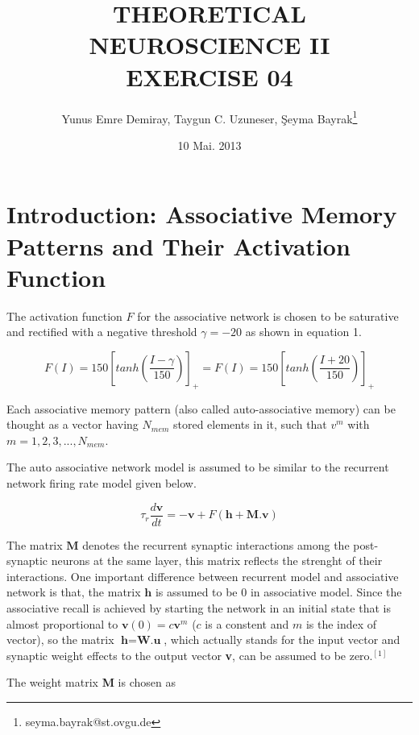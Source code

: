 \documentclass{article}
\begin{document}
\title{THEORETICAL NEUROSCIENCE II \\ EXERCISE 04}
\date{10 Mai. 2013}
\author[1]{Yunus Emre Demiray, Taygun C. Uzuneser, \c{S}eyma Bayrak\thanks{seyma.bayrak@st.ovgu.de}}
\maketitle

\newpage

\section{Introduction: Associative Memory Patterns and Their Activation Function}
The activation function $F$ for the associative network is chosen to be saturative and rectified with a negative threshold $\gamma=-20$ as shown in equation 1.

\begin{equation}
 F(I)=150[tanh(\frac{I-\gamma}{150})]_+=F(I)=150[tanh(\frac{I+20}{150})]_+
\end{equation}

Each associative memory pattern (also called auto-associative memory) can be thought as a vector having $N_{mem}$ stored elements in it, such that $v^m$ with $m=1,2,3,...,N_{mem}$.

The auto associative network model is assumed to be similar to the recurrent network firing rate model given below.

\begin{equation}
 \tau_r \frac{d\textbf{v}}{dt}=-\textbf{v}+F(\textbf{h}+\textbf{M}.\textbf{v})
\end{equation}

The matrix $\textbf{M}$ denotes the recurrent synaptic interactions among the post-synaptic neurons at the same layer, this matrix reflects the strenght of their interactions. One important difference between recurrent model and associative network is that, the matrix $\textbf{h}$ is assumed to be $0$ in associative model. Since the associative recall is achieved by starting the network in an initial state that is almost proportional to $\textbf{v}(0)=c\textbf{v}^m$ ($c$ is a constent and $m$ is the index of vector), so the matrix $\textbf{h}=\textbf{W.u}$, which actually stands for the input vector and synaptic weight effects to the output vector \textbf{v}, can be assumed to be zero.$^{[1]}$


The weight matrix \textbf{M} is chosen as 
\end{document}

